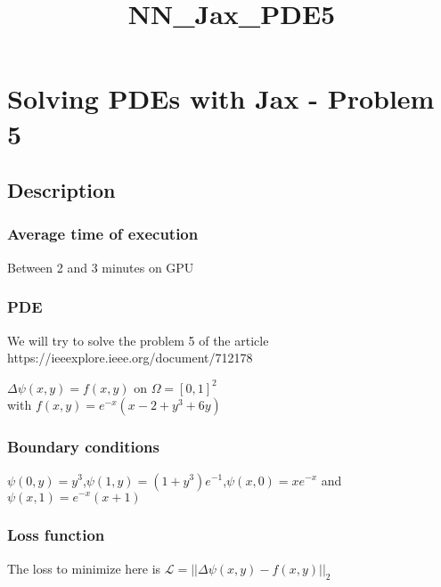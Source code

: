 \documentclass[11pt]{article}
\title{NN\_Jax\_PDE5}
\begin{document}
    
    \maketitle
    
    

    
    \hypertarget{solving-pdes-with-jax---problem-5}{%
\section{Solving PDEs with Jax - Problem
5}\label{solving-pdes-with-jax---problem-5}}

\hypertarget{description}{%
\subsection{Description}\label{description}}

\hypertarget{average-time-of-execution}{%
\subsubsection{Average time of
execution}\label{average-time-of-execution}}

Between 2 and 3 minutes on GPU

\hypertarget{pde}{%
\subsubsection{PDE}\label{pde}}

We will try to solve the problem 5 of the article
https://ieeexplore.ieee.org/document/712178

\(\Delta \psi(x,y)= f(x,y)\) on \(\Omega = [0,1]^2\)\\
with \(f(x, y)=e^{-x}(x-2+y^3+6y)\)

\hypertarget{boundary-conditions}{%
\subsubsection{Boundary conditions}\label{boundary-conditions}}

\(\psi(0,y)=y^3\),\(\psi(1,y)=(1+y^3)e^{-1}\),\(\psi(x,0)=xe^{-x}\) and
\(\psi(x,1)=e^{-x}(x+1)\)

\hypertarget{loss-function}{%
\subsubsection{Loss function}\label{loss-function}}

The loss to minimize here is
\(\mathcal{L} = ||\Delta \psi(x,y)-f(x,y) ||_2\)
\end{document}
